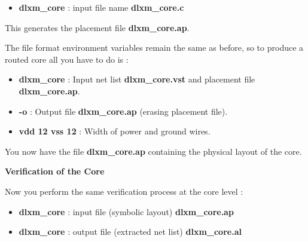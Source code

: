 \begin{itemize}
\item
{\bf dlxm\_core} : input file name {\bf dlxm\_core.c}
\end{itemize}

This generates the placement file {\bf dlxm\_core.ap}.


The file format environment variables remain the same as before, so to produce a routed core all you have to do is :


\begin {itemize}
\item {\bf dlxm\_core} : Input net list {\bf dlxm\_core.vst} and
placement file {\bf dlxm\_core.ap}.
\item {\bf -o } : Output file {\bf dlxm\_core.ap} (erasing placement file).
\item {\bf vdd 12 vss 12} : Width of power and ground wires.
\end{itemize}


You now have the file {\bf dlxm\_core.ap} containing the physical layout of the core.

{\bf Verification of the Core}

Now you perform the same verification process at the core level :


\begin{itemize}
\item
{\bf dlxm\_core} : input file (symbolic layout) {\bf dlxm\_core.ap}
\item
{\bf dlxm\_core} : output file (extracted net list) {\bf dlxm\_core.al}
\end{itemize}

